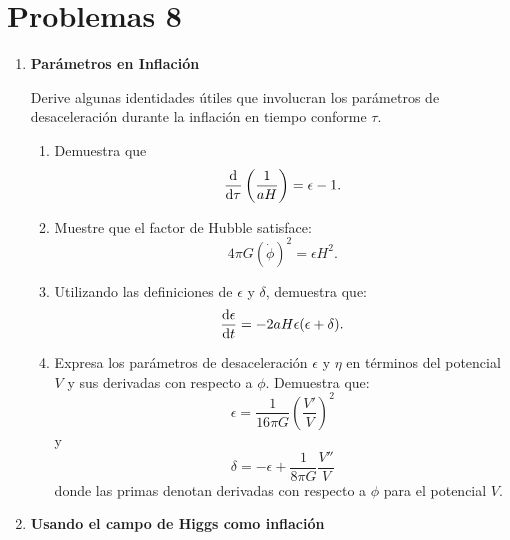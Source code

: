 \documentclass[../main]{subfiles}
\begin{document}
\section{Problemas 8}
\begin{enumerate}
    \item \textbf{Parámetros en Inflación}
    
    Derive algunas identidades útiles que involucran los parámetros de desaceleración durante la inflación en tiempo conforme $\tau$.
    \begin{enumerate}[label=(\alph*)]
        \item Demuestra que 
        \begin{equation}
            \dv{}{\tau}\left(\dfrac{1}{aH}\right)=\epsilon-1.
        \end{equation}
        \item Muestre que el factor de Hubble satisface:
        \begin{equation}
            4\pi G(\dot{\phi})^2=\epsilon H^2.
        \end{equation}
        \item Utilizando las definiciones de $\epsilon$ y $\delta$, demuestra que:
        \begin{equation}
            \dv{\epsilon}{t}=-2aH\epsilon(\epsilon+\delta).
        \end{equation}
        \item Expresa los parámetros de desaceleración $\epsilon$ y $\eta$ en términos del potencial $V$ y sus derivadas con respecto a $\phi$. Demuestra que:
        \begin{equation}
            \epsilon=\dfrac{1}{16\pi G}\left(\dfrac{V'}{V}\right)^2
        \end{equation}
        y
        \begin{equation}
            \delta=-\epsilon+\dfrac{1}{8\pi G}\dfrac{V''}{V}
        \end{equation}
        donde las primas denotan derivadas con respecto a $\phi$ para el potencial $V$.
    \end{enumerate}
    \item \textbf{Usando el campo de Higgs como inflación}
    

\end{enumerate}
\end{document}
